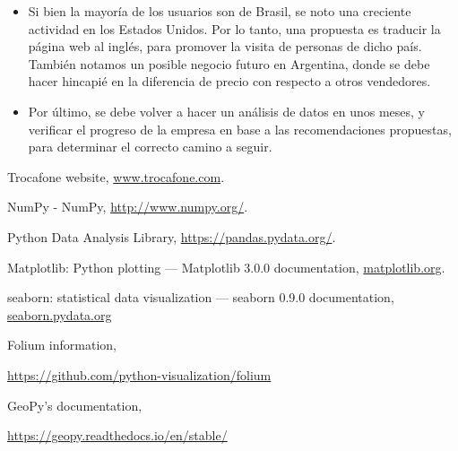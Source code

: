 \documentclass[a4paper ,12pt]{article}
\begin{document}
\begin{itemize}
\item Si bien la mayoría de los usuarios son de Brasil, se noto una creciente actividad en los Estados Unidos. Por lo tanto, una propuesta es traducir la página web al inglés, para promover la visita de personas de dicho país. También notamos un posible negocio futuro en Argentina, donde se debe hacer hincapié en la diferencia de precio con respecto a otros vendedores.  

\item Por último, se debe volver a hacer un análisis de datos en unos meses, y verificar el progreso de la empresa en base a las recomendaciones propuestas, para determinar el correcto camino a seguir.

\end{itemize}


\newpage



\begin{thebibliography}{99}
		
	\bibitem{}Trocafone website, \url{www.trocafone.com}.
	
	\bibitem{} NumPy - NumPy, \url{http://www.numpy.org/}.
	
	\bibitem{} Python Data Analysis Library,
	\url{https://pandas.pydata.org/}.
	
	\bibitem{}	Matplotlib: Python plotting — Matplotlib 3.0.0 documentation,
	\url{matplotlib.org}.
	
	
	\bibitem{}seaborn: statistical data visualization — seaborn 0.9.0 documentation,
	\url{seaborn.pydata.org}
	
	\bibitem{} Folium information,
	
	\url{https://github.com/python-visualization/folium}
	
	\bibitem{} GeoPy’s documentation,
	
	\url{
	https://geopy.readthedocs.io/en/stable/}
\end{thebibliography}
\end{document}
